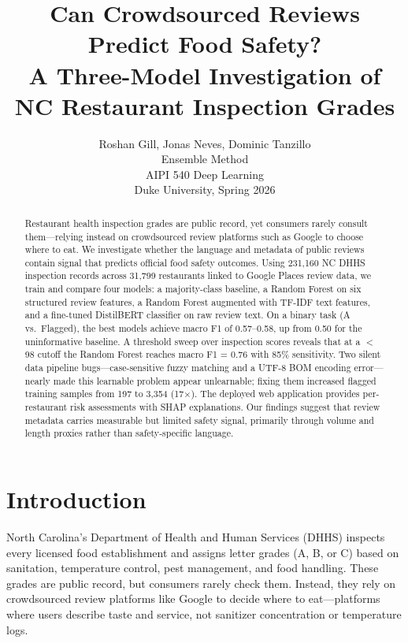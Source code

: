 \documentclass{article}
\title{Can Crowdsourced Reviews Predict Food Safety?\\A Three-Model Investigation of NC Restaurant Inspection Grades}
\author{%
  Roshan Gill, Jonas Neves, Dominic Tanzillo \\
  Ensemble Method \\
  AIPI 540 Deep Learning \\
  Duke University, Spring 2026 \\
}
\begin{document}
\maketitle

\begin{abstract}
Restaurant health inspection grades are public record, yet consumers rarely consult them---relying instead on crowdsourced review platforms such as Google to choose where to eat. We investigate whether the language and metadata of public reviews contain signal that predicts official food safety outcomes. Using 231,160 NC DHHS inspection records across 31,799 restaurants linked to Google Places review data, we train and compare four models: a majority-class baseline, a Random Forest on six structured review features, a Random Forest augmented with TF-IDF text features, and a fine-tuned DistilBERT classifier on raw review text. On a binary task (A vs.\ Flagged), the best models achieve macro F1 of 0.57--0.58, up from 0.50 for the uninformative baseline. A threshold sweep over inspection scores reveals that at a $<$98 cutoff the Random Forest reaches macro F1 = 0.76 with 85\% sensitivity. Two silent data pipeline bugs---case-sensitive fuzzy matching and a UTF-8 BOM encoding error---nearly made this learnable problem appear unlearnable; fixing them increased flagged training samples from 197 to 3,354 (17$\times$). The deployed web application provides per-restaurant risk assessments with SHAP explanations. Our findings suggest that review metadata carries measurable but limited safety signal, primarily through volume and length proxies rather than safety-specific language.
\end{abstract}

\section{Introduction}

North Carolina's Department of Health and Human Services (DHHS) inspects every licensed food establishment and assigns letter grades (A, B, or C) based on sanitation, temperature control, pest management, and food handling. These grades are public record, but consumers rarely check them. Instead, they rely on crowdsourced review platforms like Google to decide where to eat---platforms where users describe taste and service, not sanitizer concentration or temperature logs.
\end{document}
